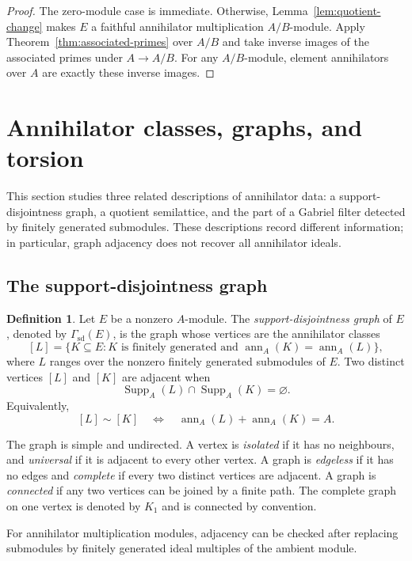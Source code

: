 \documentclass[11pt]{amsart}
\theoremstyle{plain}
\theoremstyle{definition}
\newtheorem{definition}[theorem]{Definition}
\theoremstyle{remark}
\DeclareMathOperator{\Supp}{Supp}
\newcommand{\ann}{\operatorname{ann}}
\newcommand{\GammaSD}{\Gamma_{\mathrm{sd}}}
\numberwithin{equation}{section}
\begin{document}
\begin{proof}
The zero-module case is immediate. Otherwise,
Lemma~\ref{lem:quotient-change} makes $E$ a faithful annihilator
multiplication $A/B$-module. Apply Theorem~\ref{thm:associated-primes}
over $A/B$ and take inverse images of the associated primes under
$A\to A/B$. For any $A/B$-module, element annihilators over $A$ are exactly
these inverse images.
\end{proof}

\section{Annihilator classes, graphs, and torsion}
\label{sec:graph}

This section studies three related descriptions of annihilator data:
a support-disjointness graph, a quotient semilattice, and the part of a
Gabriel filter detected by finitely generated submodules. These descriptions
record different information; in particular, graph adjacency does not recover
all annihilator ideals.

\subsection{The support-disjointness graph}

\begin{definition}
Let $E$ be a nonzero $A$-module. The \emph{support-disjointness graph} of $E$, denoted
by $\GammaSD(E)$, is the graph whose vertices are the annihilator classes
\[
[L]=\{K\subseteq E:K\text{ is finitely generated and } \ann_A(K)=\ann_A(L)\},
\]
where $L$ ranges over the nonzero finitely generated submodules of $E$. Two
distinct vertices $[L]$ and $[K]$ are adjacent when
\[
\Supp_A(L)\cap\Supp_A(K)=\varnothing.
\]
Equivalently,
\[
[L]\sim[K] \quad\iff\quad \ann_A(L)+\ann_A(K)=A.
\]
\end{definition}

The graph is simple and undirected. A vertex is \emph{isolated} if it has
no neighbours, and \emph{universal} if it is adjacent to every other vertex.
A graph is \emph{edgeless} if it has no edges and \emph{complete} if every
two distinct vertices are adjacent. A graph is \emph{connected} if any two
vertices can be joined by a finite path. The complete graph on one vertex
is denoted by $K_1$ and is connected by convention.


For annihilator multiplication modules, adjacency can be checked after replacing
submodules by finitely generated ideal multiples of the ambient module.
\end{document}
